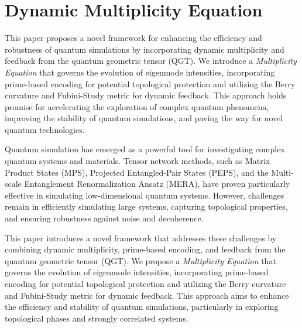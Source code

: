 \documentclass{article}
\theoremstyle{plain}
\begin{document}
\title{}

\author[1]{Nicholas Galioto}
\author[2]{Ryan Van Gelder}
\date{\today}

\maketitle
\begin{abstract}

\end{abstract}

\section{Dynamic Multiplicity Equation}
This paper proposes a novel framework for enhancing the efficiency and robustness of quantum simulations by incorporating dynamic multiplicity and feedback from the quantum geometric tensor (QGT). We introduce a \textit{Multiplicity Equation} that governs the evolution of eigenmode intensities, incorporating prime-based encoding for potential topological protection and utilizing the Berry curvature and Fubini-Study metric for dynamic feedback. This approach holds promise for accelerating the exploration of complex quantum phenomena, improving the stability of quantum simulations, and paving the way for novel quantum technologies.

Quantum simulation has emerged as a powerful tool for investigating complex quantum systems and materials. Tensor network methods, such as Matrix Product States (MPS), Projected Entangled-Pair States (PEPS), and the Multi-scale Entanglement Renormalization Ansatz (MERA), have proven particularly effective in simulating low-dimensional quantum systems. However, challenges remain in efficiently simulating large systems, capturing topological properties, and ensuring robustness against noise and decoherence.

This paper introduces a novel framework that addresses these challenges by combining dynamic multiplicity, prime-based encoding, and feedback from the quantum geometric tensor (QGT). We propose a \textit{Multiplicity Equation} that governs the evolution of eigenmode intensities, incorporating prime-based encoding for potential topological protection and utilizing the Berry curvature and Fubini-Study metric for dynamic feedback. This approach aims to enhance the efficiency and stability of quantum simulations, particularly in exploring topological phases and strongly correlated systems.
\end{document}
